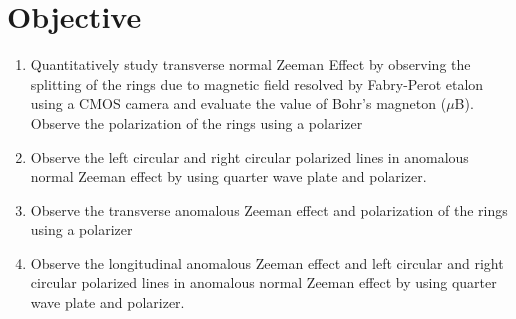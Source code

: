\section{Objective}

\begin{enumerate}
    \item Quantitatively study transverse normal Zeeman Effect by observing the splitting of the rings due to magnetic field resolved by Fabry-Perot etalon using a CMOS     camera and evaluate the value of Bohr's magneton ($\mu$B). Observe the polarization of the rings using a polarizer 
    \item Observe the left circular and right circular polarized lines in anomalous normal Zeeman effect by using quarter wave plate and polarizer. 
    \item Observe the transverse anomalous Zeeman effect and polarization of the rings using a polarizer
    \item Observe the longitudinal anomalous Zeeman effect and left circular and right
    circular polarized lines in anomalous normal Zeeman effect by using quarter
    wave plate and polarizer.    
\end{enumerate}